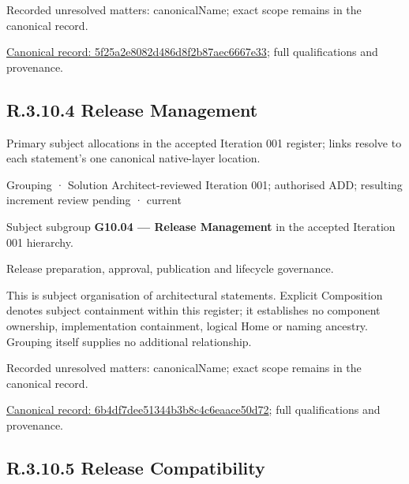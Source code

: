 {\small Recorded unresolved matters: canonicalName; exact scope remains in the canonical record.}\par
{\footnotesize \href{../../../../continuum/grouping/5f25a2e8082d486d8f2b87aec6667e33.md}{Canonical record: 5f25a2e8082d486d8f2b87aec6667e33}; full qualifications and provenance.}\par
\subsection*{R.3.10.4 Release Management}
\label{navigation:R.3.10.4}

Primary subject allocations in the accepted Iteration 001 register; links resolve to each statement’s one canonical native-layer location.\par
\label{element:6b4df7dee51344b3b8c4c6eaace50d72}
{\small Grouping · Solution Architect-reviewed Iteration 001; authorised ADD; resulting increment review pending · current}\par

Subject subgroup \textbf{G10.04 — Release Management} in the accepted Iteration 001 hierarchy.



Release preparation, approval, publication and lifecycle governance.



This is subject organisation of architectural statements. Explicit Composition denotes subject containment within this register; it establishes no component ownership, implementation containment, logical Home or naming ancestry. Grouping itself supplies no additional relationship.


{\small Recorded unresolved matters: canonicalName; exact scope remains in the canonical record.}\par
{\footnotesize \href{../../../../continuum/grouping/6b4df7dee51344b3b8c4c6eaace50d72.md}{Canonical record: 6b4df7dee51344b3b8c4c6eaace50d72}; full qualifications and provenance.}\par
\subsection*{R.3.10.5 Release Compatibility}
\label{navigation:R.3.10.5}

